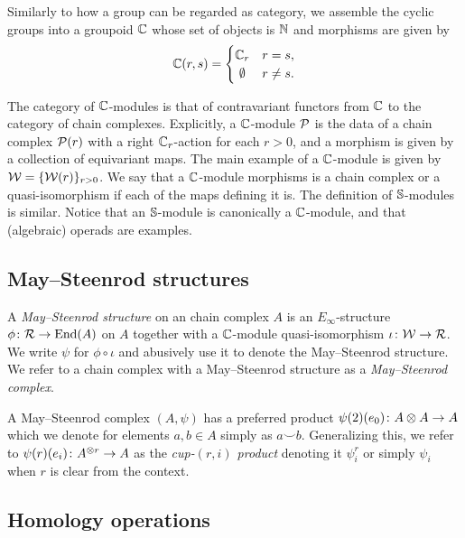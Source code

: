 Similarly to how a group can be regarded as category, we assemble the cyclic groups into a groupoid $\mathbb{C}$ whose set of objects is $\mathbb{N}$ and morphisms are given by
\[
\cyc(r,s) =
\begin{cases}
	\cyc_r & r = s, \\
	\hfil \emptyset & r \neq s.
\end{cases}
\]

The category of $\mathbb{C}$-modules is that of contravariant functors from $\mathbb{C}$ to the category of chain complexes.
Explicitly, a $\mathbb{C}$-module $\mathcal{P}$ is the data of a chain complex $\mathcal{P}(r)$ with a right $\mathbb{C}_r$-action for each $r > 0$, and a morphism is given by a collection of equivariant maps.
The main example of a $\mathbb{C}$-module is given by $\mathcal{W} = \{\mathcal{W}(r)\}_{r>0}$.
We say that a $\mathbb{C}$-module morphisms is a chain complex or a quasi-isomorphism if each of the maps defining it is.
The definition of $\mathbb{S}$-modules is similar.
Notice that an $\mathbb{S}$-module is canonically a $\mathbb{C}$-module, and that (algebraic) operads are examples.

\subsection{May--Steenrod structures}

A \textit{May--Steenrod structure} on an chain complex $A$ is an $E_\infty$-structure $\phi \colon \mathcal{R} \to \mathrm{End}(A)$ on $A$ together with a $\mathbb{C}$-module quasi-isomorphism $\iota \colon \mathcal{W} \to \mathcal{R}$.
We write $\psi$ for $\phi \circ \iota$ and abusively use it to denote the May--Steenrod structure.
We refer to a chain complex with a May--Steenrod structure as a \textit{May--Steenrod complex}.

A May--Steenrod complex $(A,\psi)$ has a preferred product $\psi(2)(e_0) \colon A \otimes A \to A$ which we denote for elements $a, b \in A$ simply as $a \smallsmile b$.
Generalizing this, we refer to $\psi(r)(e_i) \colon A^{\otimes r} \to A$ as the \textit{cup-$(r,i)$ product} denoting it $\psi_i^r$ or simply $\psi_i$ when $r$ is clear from the context.

\subsection{Homology operations}

